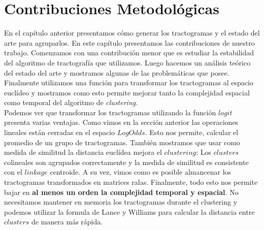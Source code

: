 \chapter{Contribuciones Metodol\'ogicas}
\label{ch:contribuciones}

En el cap\'itulo anterior presentamos c\'omo generar los tractogramas y el 
estado del arte para agruparlos. En este cap\'itulo presentamos las contribuciones
de nuestro trabajo. Comenzamos con una contribuci\'on menor que es estudiar la 
estabilidad del algoritmo de tractograf\'ia que utilizamos. Luego hacemos
un an\'alisis te\'orico del estado del arte y mostramos algunas de las 
problem\'aticas que posee. Finalmente utilizamos una funci\'on para transformar
los tractogramas al espacio eucl\'ideo y mostramos como esto permite mejorar tanto
la complejidad espacial como temporal del algoritmo de \textit{clustering}. \\











Podemos ver que transformar los tractogramas utilizando la funci\'on $logit$
presenta varias ventajas. Como vimos en la secci\'on anterior las
operaciones lineales est\'an cerradas en el espacio $LogOdds$. Esto nos permite,
calcular el promedio de un grupo de tractogramas. Tambi\'en mostramos que usar 
como medida de similitud la distancia eucl\'idea mejora el $clustering$:
Los $clusters$ colineales son agrupados correctamente y la medida de similitud
es consistente con el $linkage$ centroide. A su vez, vimos como es posible 
almancenar los tractogramas transformados en matrices ralas. Finalmente, 
todo esto nos permite bajar en \textbf{al menos un orden la complejidad temporal
y espacial}. No necesitamos mantener en memoria los tractogramas durante el
clustering y podemos utilizar la formula de Lance y Williams para calcular la
distancia entre $clusters$ de manera m\'as r\'apida. \\
